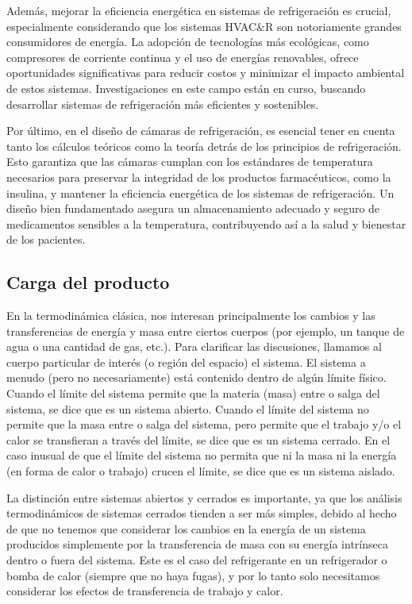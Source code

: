  Además, mejorar la eficiencia energética en sistemas de refrigeración es crucial, especialmente considerando que los sistemas HVAC\&R son notoriamente grandes consumidores de energía. La adopción de tecnologías más ecológicas, como compresores de corriente continua y el uso de energías renovables, ofrece oportunidades significativas para reducir costos y minimizar el impacto ambiental de estos sistemas. Investigaciones en este campo están en curso, buscando desarrollar sistemas de refrigeración más eficientes y sostenibles.
 
 Por último, en el diseño de cámaras de refrigeración, es esencial tener en cuenta tanto los cálculos teóricos como la teoría detrás de los principios de refrigeración. Esto garantiza que las cámaras cumplan con los estándares de temperatura necesarios para preservar la integridad de los productos farmacéuticos, como la insulina, y mantener la eficiencia energética de los sistemas de refrigeración. Un diseño bien fundamentado asegura un almacenamiento adecuado y seguro de medicamentos sensibles a la temperatura, contribuyendo así a la salud y bienestar de los pacientes. \cite{parise-2005}


	\subsection{Carga del producto }	

En la termodinámica clásica, nos interesan principalmente los cambios y las transferencias de energía y masa entre ciertos cuerpos (por ejemplo, un tanque de agua o una cantidad de gas, etc.). Para clarificar las discusiones, llamamos al cuerpo particular de interés (o región del espacio) el sistema. El sistema a menudo (pero no necesariamente) está contenido dentro de algún límite físico. Cuando el límite del sistema permite que la materia (masa) entre o salga del sistema, se dice que es un sistema abierto. Cuando el límite del sistema no permite que la masa entre o salga del sistema, pero permite que el trabajo y/o el calor se transfieran a través del límite, se dice que es un sistema cerrado. En el caso inusual de que el límite del sistema no permita que ni la masa ni la energía (en forma de calor o trabajo) crucen el límite, se dice que es un sistema aislado.

La distinción entre sistemas abiertos y cerrados es importante, ya que los análisis termodinámicos de sistemas cerrados tienden a ser más simples, debido al hecho de que no tenemos que considerar los cambios en la energía de un sistema producidos simplemente por la transferencia de masa con su energía intrínseca dentro o fuera del sistema. Este es el caso del refrigerante en un refrigerador o bomba de calor (siempre que no haya fugas), y por lo tanto solo necesitamos considerar los efectos de transferencia de trabajo y calor. \cite{james-2013}

